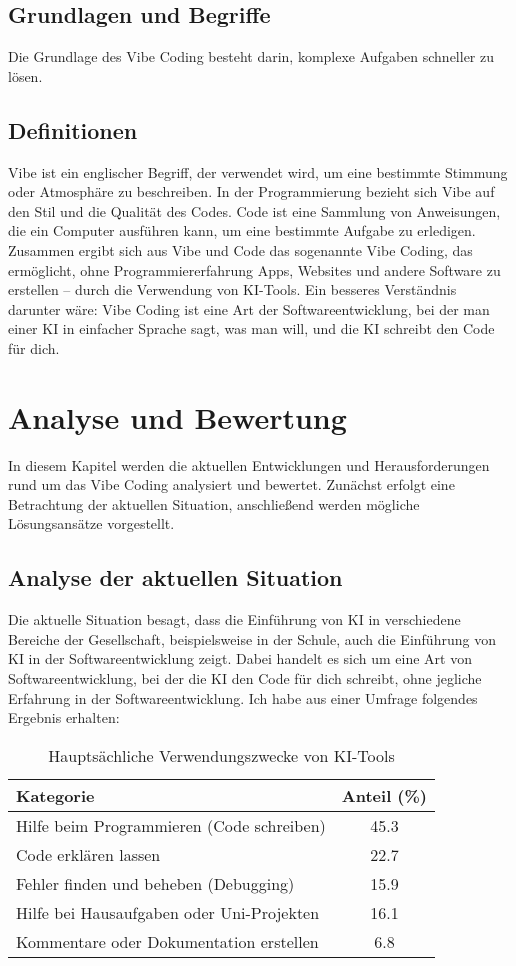 \documentclass[paper=a4,fontsize=12pt,ngerman]{scrartcl}
\begin{document}
\subsection{Grundlagen und Begriffe}
Die Grundlage des Vibe Coding besteht darin, komplexe Aufgaben schneller zu lösen.

\subsection{Definitionen}
Vibe ist ein englischer Begriff, der verwendet wird, um eine bestimmte Stimmung oder Atmosphäre zu beschreiben.
In der Programmierung bezieht sich Vibe auf den Stil und die Qualität des Codes.
Code ist eine Sammlung von Anweisungen, die ein Computer ausführen kann, um eine bestimmte Aufgabe zu erledigen.
Zusammen ergibt sich aus Vibe und Code das sogenannte Vibe Coding, das ermöglicht,
ohne Programmiererfahrung Apps, Websites und andere Software zu erstellen – durch die Verwendung von KI-Tools. 
Ein besseres Verständnis darunter wäre:
Vibe Coding ist eine Art der Softwareentwicklung, bei der man einer KI in einfacher Sprache sagt, was man will, und die KI schreibt den Code für dich. \citep{Datacamp}

\clearpage
\section{Analyse und Bewertung}
In diesem Kapitel werden die aktuellen Entwicklungen und Herausforderungen rund um das Vibe Coding analysiert und bewertet. Zunächst erfolgt eine Betrachtung der aktuellen Situation, anschließend werden mögliche Lösungsansätze vorgestellt.

\subsection{Analyse der aktuellen Situation}
Die aktuelle Situation besagt, dass die Einführung von KI in verschiedene Bereiche der Gesellschaft, 
beispielsweise in der Schule, auch die Einführung von KI in der Softwareentwicklung zeigt. 
Dabei handelt es sich um eine Art von Softwareentwicklung, bei der die KI den Code für dich schreibt,
ohne jegliche Erfahrung in der Softwareentwicklung. Ich habe aus einer Umfrage folgendes Ergebnis erhalten: 

\begin{table}[ht]
    \centering
    \caption{Hauptsächliche Verwendungszwecke von KI-Tools}
    \begin{tabular}{l S[table-format=2.1]}
    \toprule
    \textbf{Kategorie} & \textbf{Anteil (\%)} \\
    \midrule
    Hilfe beim Programmieren (Code schreiben) & 45.3 \\
    Code erklären lassen & 22.7 \\
    Fehler finden und beheben (Debugging) & 15.9 \\
    Hilfe bei Hausaufgaben oder Uni-Projekten & 16.1 \\
    Kommentare oder Dokumentation erstellen & 6.8 \\
    \bottomrule
    \end{tabular}
\end{table}
\end{document}
